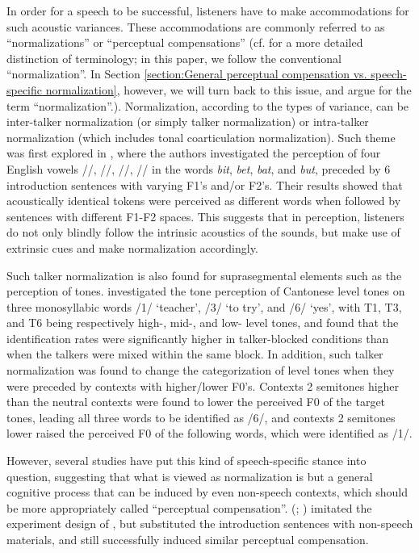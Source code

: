 In order for a speech to be successful, listeners have to make accommodations for such acoustic variances. These accommodations are commonly referred to as ``normalizations'' or ``perceptual compensations'' (cf. \cite{Zhangetal2022} for a more detailed distinction of terminology; in this paper, we follow the conventional ``normalization''. In Section \ref{section:General perceptual compensation vs. speech-specific normalization}, however, we will turn back to this issue, and argue for the term ``normalization''.). Normalization, according to the types of variance, can be inter-talker normalization (or simply talker normalization) or intra-talker normalization (which includes tonal coarticulation normalization). Such theme was first explored in \cite{LadefogedBroadbent1957}, where the authors investigated the perception of four English vowels //, //, //, // in the words \textit{bit}, \textit{bet}, \textit{bat}, and \textit{but}, preceded by 6 introduction sentences with varying F1's and/or F2's. Their results showed that acoustically identical tokens were perceived as different words when followed by sentences with different F1-F2 spaces. This suggests that in perception, listeners do not only blindly follow the intrinsic acoustics of the sounds, but make use of extrinsic cues and make normalization accordingly.

Such talker normalization is also found for suprasegmental elements such as the perception of tones. \cite{WongDiehl2003} investigated the tone perception of Cantonese level tones on three monosyllabic words /1/ `teacher', /3/ `to try', and /6/ `yes', with T1, T3, and T6 being respectively high-, mid-, and low- level tones, and found that the identification rates were significantly higher in talker-blocked conditions than when the talkers were mixed within the same block. In addition, such talker normalization was found to change the categorization of level tones when they were preceded by contexts with higher/lower F0's. Contexts 2 semitones higher than the neutral contexts were found to lower the perceived F0 of the target tones, leading all three words to be identified as /6/, and contexts 2 semitones lower raised the perceived F0 of the following words, which were identified as /1/. 

However, several studies have put this kind of speech-specific stance into question, suggesting that what is viewed as normalization is but a general cognitive process that can be induced by even non-speech contexts, which should be more appropriately called ``perceptual compensation''. \citeauthor{WatkinsMakin1994} (\citeyear{WatkinsMakin1994}; \citeyear{WatkinsMakin1996}) imitated the experiment design of \cite{LadefogedBroadbent1957}, but substituted the introduction sentences with non-speech materials, and still successfully induced similar perceptual compensation. 

